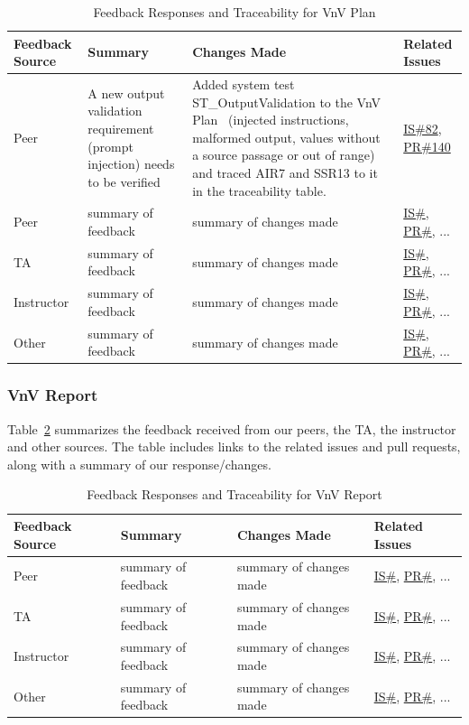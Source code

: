\documentclass{article}
\begin{document}
\begin{longtable}{|p{2cm}|p{4cm}|p{5cm}|p{4cm}|}
\caption{Feedback Responses and Traceability for VnV Plan}
\label{Tbl-VnVPlan}\\

\hline
\textbf{Feedback Source} & \textbf{Summary} & \textbf{Changes Made} & \textbf{Related Issues} \\ 
\hline
\endhead

Peer & A new output validation requirement (prompt injection) needs to be verified & Added system test ST\_OutputValidation to the VnV Plan~\citep{TeamBVSH2026VnVP} (injected instructions, malformed output, values without a source passage or out of range) and traced AIR7 and SSR13 to it in the traceability table. & \href{https://github.com/shivyam/cas-course-optimization/issues/82}{IS\#82}, \href{https://github.com/shivyam/cas-course-optimization/pull/140}{PR\#140} \\
\hline
Peer & summary of feedback & summary of changes made & \href{link}{IS\#}, \href{link}{PR\#}, ... \\
\hline
TA & summary of feedback & summary of changes made & \href{link}{IS\#}, \href{link}{PR\#}, ... \\
\hline
Instructor & summary of feedback & summary of changes made & \href{link}{IS\#}, \href{link}{PR\#}, ... \\
\hline
Other & summary of feedback & summary of changes made & \href{link}{IS\#}, \href{link}{PR\#}, ... \\
\hline
\end{longtable}

\subsubsection{VnV Report}

Table~\ref{Tbl-VnVReport} summarizes the feedback received from our peers, the
TA, the instructor and other sources.  The table includes links to the related
issues and pull requests, along with a summary of our response/changes.

\begin{longtable}{|p{2cm}|p{4cm}|p{5cm}|p{4cm}|}
\caption{Feedback Responses and Traceability for VnV Report}
\label{Tbl-VnVReport}\\

\hline
\textbf{Feedback Source} & \textbf{Summary} & \textbf{Changes Made} & \textbf{Related Issues} \\ 
\hline
\endhead

Peer & summary of feedback & summary of changes made & \href{link}{IS\#}, \href{link}{PR\#}, ... \\
\hline
TA & summary of feedback & summary of changes made & \href{link}{IS\#}, \href{link}{PR\#}, ... \\
\hline
Instructor & summary of feedback & summary of changes made & \href{link}{IS\#}, \href{link}{PR\#}, ... \\
\hline
Other & summary of feedback & summary of changes made & \href{link}{IS\#}, \href{link}{PR\#}, ... \\
\hline
\end{longtable}
\end{document}
